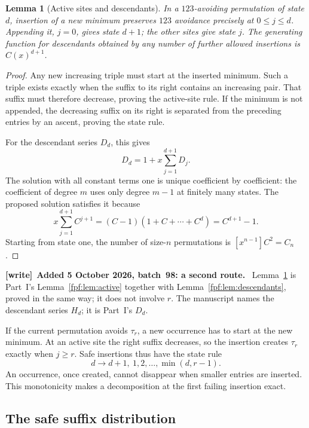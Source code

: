 \documentclass[11pt]{article}
\numberwithin{equation}{section}
\newtheorem{lemma}[theorem]{Lemma}
\theoremstyle{definition}
\newenvironment{writenote}[1][]{\par\smallskip\begingroup\small
 \noindent\textbf{[write]}\if\relax\detokenize{#1}\relax\else~\textbf{#1.}\fi\ }%
 {\par\endgroup\smallskip}
\begin{document}
\begin{lemma}[Active sites and descendants]\label{fpf:lp:lem:active}
In a \(123\)-avoiding permutation of state \(d\), insertion of a new
minimum preserves \(123\) avoidance precisely at \(0\le j\le d\).
Appending it, \(j=0\), gives state \(d+1\); the other sites give state
\(j\). The generating function for descendants obtained by any number
of further allowed insertions is \(C(x)^{d+1}\).
\end{lemma}
\begin{proof}
Any new increasing triple must start at the inserted minimum. Such a
triple exists exactly when the suffix to its right contains an increasing
pair. That suffix must therefore decrease, proving the active-site rule.
If the minimum is not appended, the decreasing suffix on its right is
separated from the preceding entries by an ascent, proving the state rule.

For the descendant series \(D_d\), this gives
\[
 D_d=1+x\sum_{j=1}^{d+1}D_j.
\]
The solution with all constant terms one is unique coefficient by
coefficient: the coefficient of degree \(m\) uses only degree \(m-1\)
at finitely many states. The proposed solution satisfies it because
\[
 x\sum_{j=1}^{d+1}C^{j+1}
 =(C-1)(1+C+\cdots+C^d)=C^{d+1}-1.
\]
Starting from state one, the number of size-\(n\) permutations is
\([x^{n-1}]C^2=C_n\).
\end{proof}

\begin{writenote}[Added 5 October 2026, batch~98: a second route]
Lemma~\ref{fpf:lp:lem:active} is Part~I's Lemma~\ref{fpf:lem:active}
together with Lemma~\ref{fpf:lem:descendants}, proved in the same way; it
does not involve \(r\). The manuscript names the descendant series
\(H_d\); it is Part~I's \(D_d\).
\end{writenote}

If the current permutation avoids \(\tau_r\), a new occurrence has to
start at the new minimum. At an active site the right suffix decreases,
so the insertion creates \(\tau_r\) exactly when \(j\ge r\). Safe
insertions thus have the state rule
\begin{equation}\label{fpf:lp:eq:safe-rule}
 d\longrightarrow d+1,\ 1,2,\ldots,\min(d,r-1).
\end{equation}
An occurrence, once created, cannot disappear when smaller entries are
inserted. This monotonicity makes a decomposition at the first failing
insertion exact.

\subsection{The safe suffix distribution}
\end{document}
